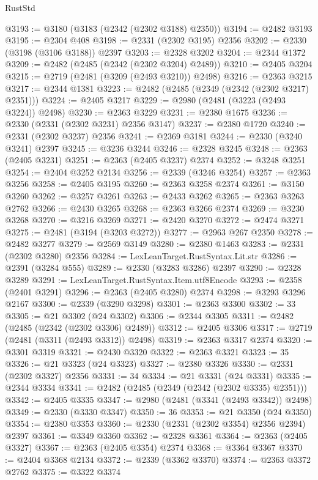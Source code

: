 \begin{lexlean}{RustStd}
\begin{coremodule}
@3193 := @3180 (@3183 (@2342 (@2302 @3188) @2350))
@3194 := @2482 @3193
@3195 := @2304 @408
@3198 := @2331 (@2302 @3195) @2356
@3202 := @2330 (@3198 (@3106 @3188)) @2397
@3203 := @2328 @3202
@3204 := @2344 @1372
@3209 := @2482 (@2485 (@2342 (@2302 @3204) @2489))
@3210 := @2405 @3204
@3215 := @2719 (@2481 (@3209 (@2493 @3210)) @2498)
@3216 := @2363 @3215
@3217 := @2344 @1381
@3223 := @2482 (@2485 (@2349 (@2342 (@2302 @3217) @2351)))
@3224 := @2405 @3217
@3229 := @2980 (@2481 (@3223 (@2493 @3224)) @2498)
@3230 := @2363 @3229
@3231 := @2380 @1675
@3236 := @2330 (@2331 (@2302 @3231) @2356 @3147)
@3237 := @2380 @1720
@3240 := @2331 (@2302 @3237) @2356
@3241 := @2369 @3181
@3244 := @2330 (@3240 @3241) @2397
@3245 := @3236 @3244
@3246 := @2328 @3245
@3248 := @2363 (@2405 @3231)
@3251 := @2363 (@2405 @3237) @2374
@3252 := @3248 @3251
@3254 := @2404 @3252 @2134
@3256 := @2339 (@3246 @3254)
@3257 := @2363 @3256
@3258 := @2405 @3195
@3260 := @2363 @3258 @2374
@3261 := @3150 @3260
@3262 := @3257 @3261
@3263 := @2433 @3262
@3265 := @2363 @3263 @2762
@3266 := @2430 @3265
@3268 := @2363 @3266 @2374
@3269 := @3230 @3268
@3270 := @3216 @3269
@3271 := @2420 @3270
@3272 := @2474 @3271
@3275 := @2481 (@3194 (@3203 @3272))
@3277 := @2963 @267 @2350
@3278 := @2482 @3277
@3279 := @2569 @3149
@3280 := @2380 @1463
@3283 := @2331 (@2302 @3280) @2356
@3284 := LexLeanTarget.RustSyntax.Lit.str
@3286 := @2391 (@3284 @555)
@3289 := @2330 (@3283 @3286) @2397
@3290 := @2328 @3289
@3291 := LexLeanTarget.RustSyntax.Item.utf8Encode
@3293 := @2358 (@2401 @3291)
@3296 := @2363 (@2405 @3280) @2374
@3298 := @3293 @3296 @2167
@3300 := @2339 (@3290 @3298)
@3301 := @2363 @3300
@3302 := 33
@3305 := @21 @3302 (@24 @3302)
@3306 := @2344 @3305
@3311 := @2482 (@2485 (@2342 (@2302 @3306) @2489))
@3312 := @2405 @3306
@3317 := @2719 (@2481 (@3311 (@2493 @3312)) @2498)
@3319 := @2363 @3317 @2374
@3320 := @3301 @3319
@3321 := @2430 @3320
@3322 := @2363 @3321
@3323 := 35
@3326 := @21 @3323 (@24 @3323)
@3327 := @2380 @3326
@3330 := @2331 (@2302 @3327) @2356
@3331 := 34
@3334 := @21 @3331 (@24 @3331)
@3335 := @2344 @3334
@3341 := @2482 (@2485 (@2349 (@2342 (@2302 @3335) @2351)))
@3342 := @2405 @3335
@3347 := @2980 (@2481 (@3341 (@2493 @3342)) @2498)
@3349 := @2330 (@3330 @3347)
@3350 := 36
@3353 := @21 @3350 (@24 @3350)
@3354 := @2380 @3353
@3360 := @2330 (@2331 (@2302 @3354) @2356 @2394) @2397
@3361 := @3349 @3360
@3362 := @2328 @3361
@3364 := @2363 (@2405 @3327)
@3367 := @2363 (@2405 @3354) @2374
@3368 := @3364 @3367
@3370 := @2404 @3368 @2134
@3372 := @2339 (@3362 @3370)
@3374 := @2363 @3372 @2762
@3375 := @3322 @3374

\end{coremodule}
\end{lexlean}
